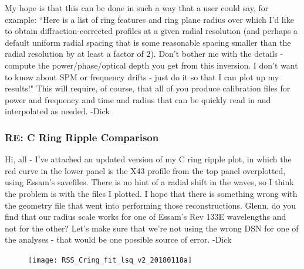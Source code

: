 \documentclass[crop=false,class=book]{standalone}
\begin{document}
My hope is that this can be done in such a way that a user could say, for example: ``Here is a list of ring features and ring plane radius over which I'd like to obtain diffraction-corrected profiles at a given radial resolution (and perhaps a default uniform radial spacing that is some reasonable spacing smaller than the radial resolution by at least a factor of 2). Don't bother me with the details - compute the power/phase/optical depth you get from this inversion. I don't want to know about SPM or frequency drifts - just do it so that I can plot up my results!" This will require, of course, that all of you produce calibration files for power and frequency and time and radius that can be quickly read in and interpolated as needed. -Dick
\subsubsection{\footnotesize RE: C Ring Ripple Comparison}
Hi, all - I've attached an updated version of my C ring ripple plot, in which the red curve in the lower panel is the X43 profile from the top panel overplotted, using Essam's savefiles. There is no hint of a radial shift in the waves, so I think the problem is with the files I plotted. I hope that there is something wrong with the geometry file that went into performing those reconstructions. Glenn, do you find that our radius scale works for one of Essam's Rev 133E wavelengths and not for the other? Let's make sure that we're not using the wrong DSN for one of the analyses - that would be one possible source of error. -Dick
\begin{figure}[H]
    \centering
    \texttt{[image: RSS\_Cring\_fit\_lsq\_v2\_20180118a]}
\end{figure}
\end{document}
